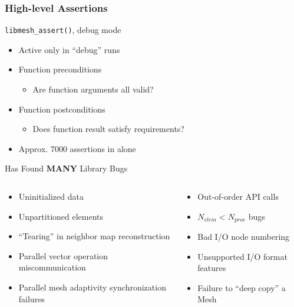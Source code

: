 \begin{frame}
\frametitle{High-level Assertions}
\begin{block}{{\texttt{libmesh\_assert()}, \PETSc} debug mode}
\begin{itemize}
\item Active only in ``debug'' runs
\item Function preconditions
\begin{itemize}
\item Are function arguments all valid?
\end{itemize}
\item Function postconditions
\begin{itemize}
\item Does function result satisfy requirements?
\end{itemize}
\item Approx. 7000 assertions in \libMesh alone
\end{itemize}
\end{block}

\pause

\begin{block}{Has Found {\bf MANY} Library Bugs}
\begin{columns}[t]
\begin{column}{.5\textwidth}
\begin{itemize}
\item {\small Uninitialized data}
\item {\footnotesize Unpartitioned elements}
\item {\scriptsize ``Tearing'' in neighbor map reconstruction}
\item {\scriptsize Parallel vector operation miscommunication}
\item {\tiny Parallel mesh adaptivity synchronization failures}
\end{itemize}
\end{column}
\begin{column}{.5\textwidth}
\begin{itemize}
\item {\small Out-of-order API calls}
\item {\footnotesize $N_{elem} < N_{proc}$ bugs}
\item {\scriptsize Bad I/O node numbering}
\item {\scriptsize Unsupported I/O format features}
\item {\tiny Failure to ``deep copy'' a Mesh}
\end{itemize}
\end{column}
\end{columns}
\end{block}
\end{frame}

